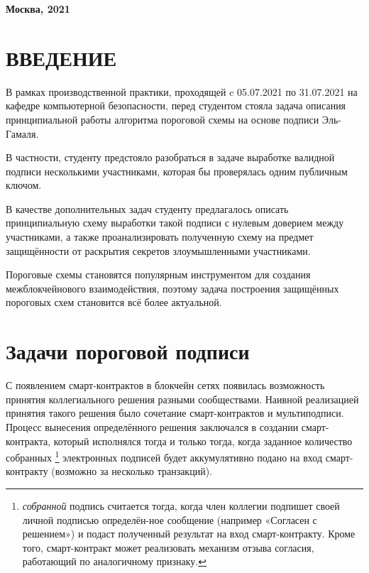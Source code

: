\documentclass[a4paper,12pt]{article}
\theoremstyle{definition}
\begin{document}
	\begin{center}
		
		\vfill
		\textbf{Москва, 2021}
	\end{center}
	
	\newpage
	\tableofcontents
	
	\newpage
	\section*{ВВЕДЕНИЕ}
	
	В рамках производственной практики, проходящей c 05.07.2021 по 31.07.2021 на кафедре компьютерной безопасности, перед студентом стояла задача описания принципиальной работы алгоритма пороговой схемы на основе подписи Эль-Гамаля. 
	
	В частности, студенту предстояло разобраться в задаче выработке валидной подписи несколькими участниками, которая бы проверялась одним публичным ключом. 
	
	В качестве дополнительных задач студенту предлагалось описать принципиальную схему выработки такой подписи с нулевым доверием между участниками, а также проанализировать полученную схему на предмет защищённости от раскрытия секретов злоумышленными участниками. 
	
	Пороговые схемы становятся популярным инструментом для создания межблокчейнового взаимодействия, поэтому задача построения защищённых пороговых схем становится всё более актуальной.
	
	\newpage
	\section{Задачи пороговой подписи }	
	
	С появлением смарт-контрактов в блокчейн сетях появилась возможность принятия коллегиального решения разными сообществами. Наивной реализацией принятия такого решения было сочетание смарт-контрактов и мультиподписи. Процесс вынесения определённого решения заключался в создании смарт-контракта, который исполнялся тогда и только тогда, когда заданное количество собранных 
	\footnote{\emph{собранной} подпись считается тогда, когда член коллегии подпишет своей личной подписью определён-ное сообщение (например «Согласен с решением») и подаст полученный результат на вход смарт-контракту. Кроме того, смарт-контракт может реализовать механизм отзыва согласия, работающий по аналогичному признаку.}  
	электронных подписей будет аккумулятивно подано на вход смарт-контракту (возможно за несколько транзакций). 
	
\end{document}
